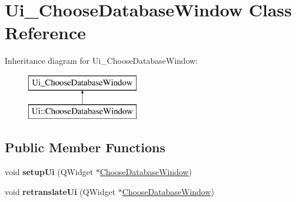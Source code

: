 \hypertarget{class_ui___choose_database_window}{}\section{Ui\+\_\+\+Choose\+Database\+Window Class Reference}
\label{class_ui___choose_database_window}
Inheritance diagram for Ui\+\_\+\+Choose\+Database\+Window\+:\begin{figure}[H]
\begin{center}
\leavevmode
\includegraphics[height=2.000000cm]{class_ui___choose_database_window}
\end{center}
\end{figure}
\subsection*{Public Member Functions}
\begin{DoxyCompactItemize}
\item 
\mbox{\label{class_ui___choose_database_window_a00855a927ef06e319c7fefefd7aad3a8}} 
void {\bfseries setup\+Ui} (Q\+Widget $\ast$\mbox{\hyperlink{class_choose_database_window}{Choose\+Database\+Window}})
\item 
\mbox{\label{class_ui___choose_database_window_a7f26434d7baa953de715b029e36defbf}} 
void {\bfseries retranslate\+Ui} (Q\+Widget $\ast$\mbox{\hyperlink{class_choose_database_window}{Choose\+Database\+Window}})
\end{DoxyCompactItemize}
